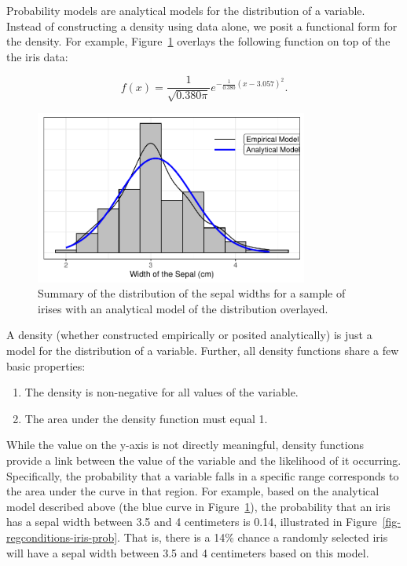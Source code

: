 \documentclass[
  letterpaper,
  DIV=11,
  numbers=noendperiod]{scrreprt}
\providecommand{\tightlist}{%
  \setlength{\itemsep}{0pt}\setlength{\parskip}{0pt}}\usepackage{longtable,booktabs,array}
\theoremstyle{definition}
\theoremstyle{definition}
\theoremstyle{plain}
\theoremstyle{remark}
\begin{document}
Probability models are analytical models for the distribution of a
variable. Instead of constructing a density using data alone, we posit a
functional form for the density. For example,
Figure~\ref{fig-regconditions-iris-normal} overlays the following
function on top of the the iris data:

\[f(x) = \frac{1}{\sqrt{0.380\pi}} e^{-\frac{1}{0.380}(x - 3.057)^2}.\]

\begin{figure}

{\centering \includegraphics[width=0.8\textwidth,height=\textheight]{./images/fig-regconditions-iris-normal-1.pdf}

}

\caption{\label{fig-regconditions-iris-normal}Summary of the
distribution of the sepal widths for a sample of irises with an
analytical model of the distribution overlayed.}

\end{figure}

A density (whether constructed empirically or posited analytically) is
just a model for the distribution of a variable. Further, all density
functions share a few basic properties:

\begin{enumerate}
\def\labelenumi{\arabic{enumi}.}
\tightlist
\item
  The density is non-negative for all values of the variable.
\item
  The area under the density function must equal 1.
\end{enumerate}

While the value on the y-axis is not directly meaningful, density
functions provide a link between the value of the variable and the
likelihood of it occurring. Specifically, the probability that a
variable falls in a specific range corresponds to the area under the
curve in that region. For example, based on the analytical model
described above (the blue curve in
Figure~\ref{fig-regconditions-iris-normal}), the probability that an
iris has a sepal width between 3.5 and 4 centimeters is 0.14,
illustrated in Figure~\ref{fig-regconditions-iris-prob}. That is, there
is a 14\% chance a randomly selected iris will have a sepal width
between 3.5 and 4 centimeters based on this model.
\end{document}
